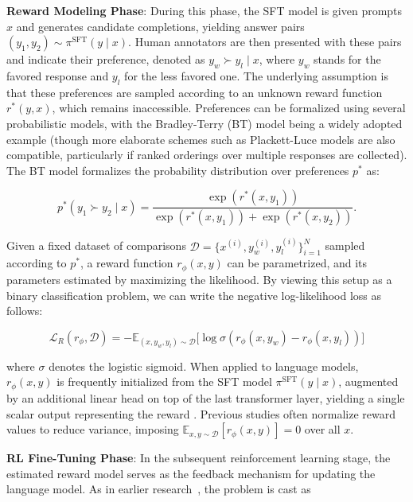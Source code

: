 \textbf{Reward Modeling Phase}: During this phase, the SFT model is given prompts $x$ and generates candidate completions, yielding answer pairs $(y_1, y_2)\sim \pi^\text{SFT}(y \mid x)$. Human annotators are then presented with these pairs and indicate their preference, denoted as $y_w\succ y_l \mid x$, where $y_w$ stands for the favored response and $y_l$ for the less favored one. The underlying assumption is that these preferences are sampled according to an unknown reward function $r^*(y, x)$, which remains inaccessible. Preferences can be formalized using several probabilistic models, with the Bradley-Terry (BT) \cite{bradley1952rankanalysis} model being a widely adopted example (though more elaborate schemes such as Plackett-Luce models \citep{plackett1975analysis, luce2012individual} are also compatible, particularly if ranked orderings over multiple responses are collected). The BT model formalizes the probability distribution over preferences $p^*$ as:

\begin{equation}\label{eq:bradley-terry}
    p^*(y_1\succ y_2 \mid x)=\frac{\exp\left(r^*(x, y_1)\right)}{\exp\left(r^*(x, y_1)\right) + \exp\left(r^*(x, y_2)\right)}.
\end{equation}

Given a fixed dataset of comparisons $\mathcal{D}=\bigl\{x^{(i)}, y_w^{(i)}, y_l^{(i)}\bigr\}_{i=1}^N$ sampled according to $p^*$, a reward function $r_{\phi}(x, y)$ can be parametrized, and its parameters estimated by maximizing the likelihood. By viewing this setup as a binary classification problem, we can write the negative log-likelihood loss as follows:

\begin{equation}\label{eq:reward_model}
    \mathcal{L}_R(r_{\phi}, \mathcal{D}) = -\mathbb{E}_{(x, y_w, y_l)\sim \mathcal{D}}\bigl[\log \sigma(r_{\phi}(x, y_w)- r_{\phi}(x, y_l))\bigr]
\end{equation}

where $\sigma$ denotes the logistic sigmoid. When applied to language models, $r_{\phi}(x, y)$ is frequently initialized from the SFT model $\pi^\text{SFT}(y \mid x)$, augmented by an additional linear head on top of the last transformer layer, yielding a single scalar output representing the reward \cite{ziegler2020finetuning}. Previous studies often normalize reward values to reduce variance, imposing $\mathbb{E}_{x,y\sim \mathcal{D}}\left[r_\phi(x, y)\right] = 0$ over all $x$.

\textbf{RL Fine-Tuning Phase}: In the subsequent reinforcement learning stage, the estimated reward model serves as the feedback mechanism for updating the language model. As in earlier research~\citep{jaques2017sequence, jaques2020human}, the problem is cast as


